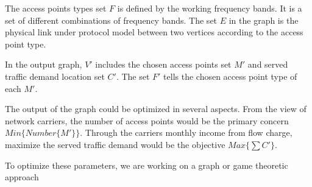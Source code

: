 The access points types set $F$ is defined by the working frequency bands. It is 
a set of different combinations of frequency bands. The set $E$ in the graph is the 
physical link under protocol model between two vertices according to the access 
point type.

In the output graph, $V'$ includes the chosen access points set $M'$ and served 
traffic demand location set $C'$. The set $F'$ tells the chosen access point 
type of each $M'$. 

% 

The output of the graph could be optimized in several aspects. From the view of network carriers,
the number of access points would be the primary concern $Min{\{Number\{M'\}\}}$.
Through the carriers monthly income from flow charge, maximize the served traffic
demand would be the objective $Max{\{\sum{C'}\}}$. 

To optimize these parameters, we are working on a graph or game theoretic approach
